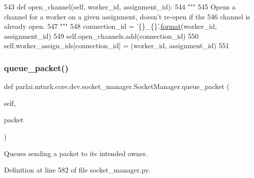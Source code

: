 \begin{DoxyCode}
543     \textcolor{keyword}{def }open\_channel(self, worker\_id, assignment\_id):
544         \textcolor{stringliteral}{"""}
545 \textcolor{stringliteral}{        Opens a channel for a worker on a given assignment, doesn't re-open if the}
546 \textcolor{stringliteral}{        channel is already open.}
547 \textcolor{stringliteral}{        """}
548         connection\_id = \textcolor{stringliteral}{'\{\}\_\{\}'}.\hyperlink{namespaceparlai_1_1chat__service_1_1services_1_1messenger_1_1shared__utils_a32e2e2022b824fbaf80c747160b52a76}{format}(worker\_id, assignment\_id)
549         self.open\_channels.add(connection\_id)
550         self.worker\_assign\_ids[connection\_id] = (worker\_id, assignment\_id)
551 
\end{DoxyCode}
\mbox{\label{classparlai_1_1mturk_1_1core_1_1dev_1_1socket__manager_1_1SocketManager_ac22bce0f2227feb7d76132fe565e11da}} 
\subsubsection{\texorpdfstring{queue\+\_\+packet()}{queue\_packet()}}
{\footnotesize\ttfamily def parlai.\+mturk.\+core.\+dev.\+socket\+\_\+manager.\+Socket\+Manager.\+queue\+\_\+packet (\begin{DoxyParamCaption}\item[{}]{self,  }\item[{}]{packet }\end{DoxyParamCaption})}

\begin{DoxyVerb}Queues sending a packet to its intended owner.
\end{DoxyVerb}
 

Definition at line 582 of file socket\+\_\+manager.\+py.


